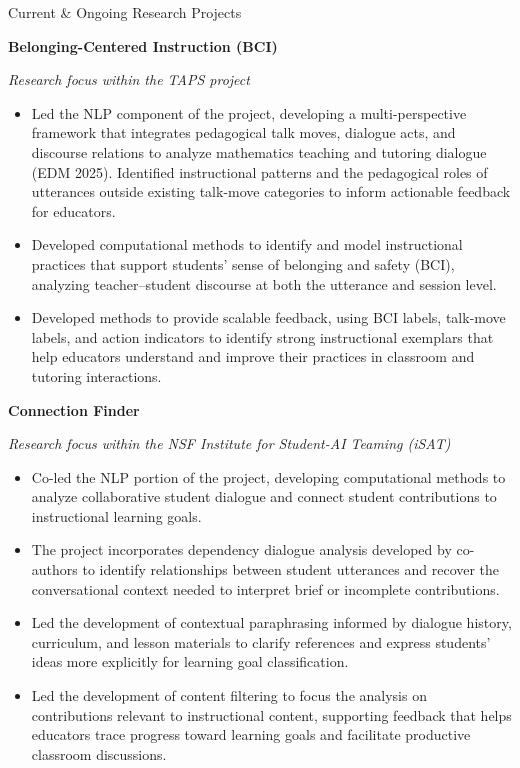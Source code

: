 \documentclass[11pt,letterpaper]{article}
\newcommand{\researchproject}[3]{%
  \hspace*{1.55em}\parbox[t]{0.955\linewidth}{%
    \textbf{#1}\par
    \vspace{0.08em}
    {\small\itshape\color{gray} #2}\par
    \vspace{0.18em}
    {\small #3}
  }\par
  \vspace{0.75em}%
}
\newcommand{\cvsection}[1]{%
  \vspace{1.15em}%
  {\Large #1}\par
  \vspace{0.55em}%
}
\begin{document}
\cvsection{Current \& Ongoing Research Projects}

\researchproject
  {Belonging-Centered Instruction (BCI)}
  {Research focus within the TAPS project}
  {\begin{itemize}[leftmargin=1.3em,topsep=0pt,itemsep=0.2em,parsep=0pt]
    \item Led the NLP component of the project, developing a multi-perspective framework that integrates pedagogical talk moves, dialogue acts, and discourse relations to analyze mathematics teaching and tutoring dialogue (EDM 2025). Identified instructional patterns and the pedagogical roles of utterances outside existing talk-move categories to inform actionable feedback for educators.
    \item Developed computational methods to identify and model instructional practices that support students' sense of belonging and safety (BCI), analyzing teacher--student discourse at both the utterance and session level.
    \item Developed methods to provide scalable feedback, using BCI labels, talk-move labels, and action indicators to identify strong instructional exemplars that help educators understand and improve their practices in classroom and tutoring interactions.
  \end{itemize}}

\researchproject
  {Connection Finder}
  {Research focus within the NSF Institute for Student-AI Teaming (iSAT)}
  {\begin{itemize}[leftmargin=1.3em,topsep=0pt,itemsep=0.2em,parsep=0pt]
    \item Co-led the NLP portion of the project, developing computational methods to analyze collaborative student dialogue and connect student contributions to instructional learning goals.
    \item The project incorporates dependency dialogue analysis developed by co-authors to identify relationships between student utterances and recover the conversational context needed to interpret brief or incomplete contributions.
    \item Led the development of contextual paraphrasing informed by dialogue history, curriculum, and lesson materials to clarify references and express students' ideas more explicitly for learning goal classification.
    \item Led the development of content filtering to focus the analysis on contributions relevant to instructional content, supporting feedback that helps educators trace progress toward learning goals and facilitate productive classroom discussions.
  \end{itemize}}
\end{document}
